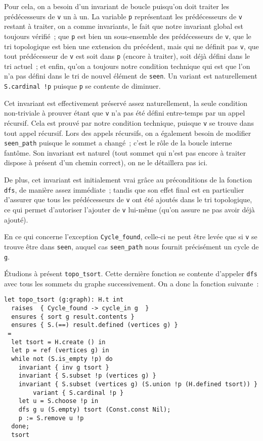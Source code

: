 \documentclass[a4paper,10pt]{article}
\begin{document}
Pour cela, on a besoin d'un invariant de boucle puisqu'on doit traiter les prédécesseurs de \lstinline{v} un à un. La variable \lstinline{p} représentant les prédécesseurs de \lstinline{v} restant à traiter, on a comme invariants, le fait que notre invariant global est toujours vérifié~; que \lstinline{p} est bien un sous-ensemble des prédécesseurs de \lstinline{v}, que le tri topologique est bien une extension du précédent, mais qui ne définit pas \lstinline{v}, que tout prédécesseur de \lstinline{v} est soit dans \lstinline{p} (encore à traiter), soit déjà défini dans le tri actuel~; et enfin, qu'on a toujours notre condition technique qui est que l'on n'a pas défini dans le tri de nouvel élément de \lstinline{seen}. Un variant est naturellement \lstinline{S.cardinal !p} puisque \lstinline{p} se contente de diminuer.

Cet invariant est effectivement préservé assez naturellement, la seule condition non-triviale à prouver étant que \lstinline{v} n'a pas été défini entre-temps par un appel récursif. Cela est prouvé par notre condition technique, puisque \lstinline{v} se trouve dans tout appel récursif. Lors des appels récursifs, on a également besoin de modifier \lstinline{seen_path} puisque le sommet a changé~; c'est le rôle de la boucle interne fantôme. Son invariant est naturel (tout sommet qui n'est pas encore à traiter dispose à présent d'un chemin correct), on ne le détaillera pas ici.

De plus, cet invariant est initialement vrai grâce au préconditions de la fonction \lstinline{dfs}, de manière assez immédiate~; tandis que son effet final est en particulier d'assurer que tous les prédécesseurs de \lstinline{v} ont été ajoutés dans le tri topologique, ce qui permet d'autoriser l'ajouter de \lstinline{v} lui-même (qu'on assure ne pas avoir déjà ajouté).

En ce qui concerne l'exception \lstinline{Cycle_found}, celle-ci ne peut être levée que si \lstinline{v} se trouve être dans \lstinline{seen}, auquel cas \lstinline{seen_path} nous fournit précisément un cycle de \lstinline{g}.

Étudions à présent \lstinline{topo_tsort}. Cette dernière fonction se contente d'appeler \lstinline{dfs} avec tous les sommets du graphe successivement. On a donc la fonction suivante~:

\begin{lstlisting}
let topo_tsort (g:graph): H.t int
  raises  { Cycle_found -> cycle_in g  }
  ensures { sort g result.contents }
  ensures { S.(==) result.defined (vertices g) }
 =
  let tsort = H.create () in
  let p = ref (vertices g) in
  while not (S.is_empty !p) do
    invariant { inv g tsort }
    invariant { S.subset !p (vertices g) }
    invariant { S.subset (vertices g) (S.union !p (H.defined tsort)) }
		variant { S.cardinal !p }
    let u = S.choose !p in
    dfs g u (S.empty) tsort (Const.const Nil);
    p := S.remove u !p
  done;
  tsort
\end{lstlisting}
\end{document}
